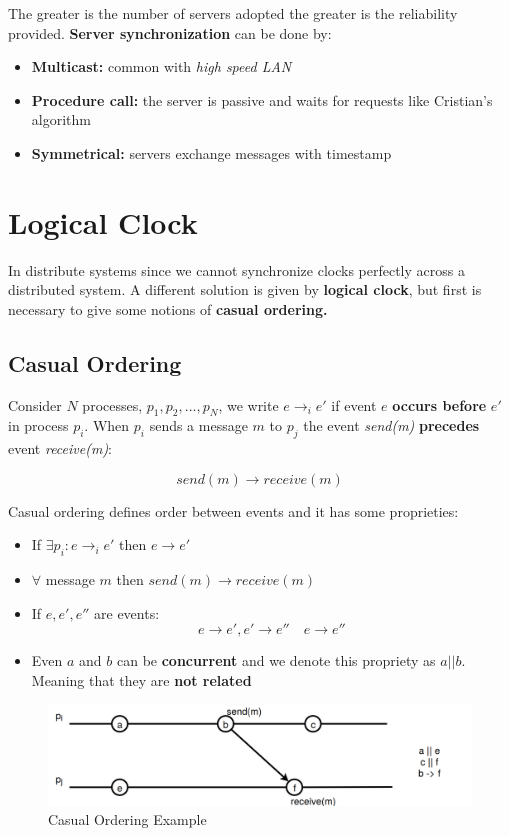 The greater is the number of servers adopted the greater is the reliability provided.
\textbf{Server synchronization} can be done by:
\begin{itemize}
    \item \textbf{Multicast:} common with \textit{high speed LAN}
    \item \textbf{Procedure call:} the server is passive and waits for requests like Cristian's algorithm
    \item \textbf{Symmetrical:} servers exchange messages with timestamp
\end{itemize}

\section{Logical Clock}
In distribute systems since we cannot synchronize clocks perfectly across a distributed system. A different solution is given by \textbf{logical clock}, but first is necessary to give some notions of \textbf{casual ordering.}

\subsection{Casual Ordering}
Consider \(N\) processes, \(p_1,p_2,...,p_N\), we write \(e \rightarrow_i e'\) if event \(e\) \textbf{occurs before} \(e'\) in process \(p_i\). When \(p_i\) sends a message \(m\) to \(p_j\) the event \textit{send(m)} \textbf{precedes} event \textit{receive(m)}:

\[send(m) \rightarrow receive(m)\]

Casual ordering defines order between events and it has some proprieties:
\begin{itemize}
    \item If \(\exists p_i: e \rightarrow_i e'\) then \(e \rightarrow e'\)
    \item \(\forall\) message \(m\) then \(send(m) \rightarrow receive(m)\)
    \item If \(e, e', e''\) are events:
    \[e \rightarrow e', e' \rightarrow e'' \quad e \rightarrow e''\]
    \item Even \(a\) and \(b\) can be \textbf{concurrent} and we denote this propriety as \(a||b\). Meaning that they are \textbf{not related} 
\end{itemize}

\begin{figure}[!h]
    \centering
    \includegraphics[width=.60\linewidth]{images/Clock/causalOrdering.png}
    \caption{Casual Ordering Example}
\end{figure}

